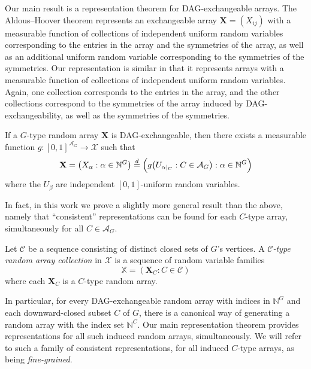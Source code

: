 \documentclass[AHL,Unicode,longabstracts,published]{cedram}
\newcommand{\indices}[1]{\mathbb{N}^{#1}}
\renewcommand{\d}{\buildrel{d}\over{=}}
\renewcommand{\AA}{\mathcal{A}}
\newcommand*\CC{{\mathcal{C}}}
\newcommand*\XX{{\mathcal{X}}}
\newcommand*\bX{\mathbf{X}}
\begin{document}
Our main result is a representation theorem for DAG-exchangeable arrays. The Aldous--Hoover theorem represents an exchangeable array $\bX = (X_{ij})$ with a measurable function of collections of independent uniform random variables corresponding to the entries in the array and the symmetries of the array, as well as an additional uniform random variable corresponding to the symmetries of the symmetries. Our representation is similar in that it represents arrays with a measurable function of collections of independent uniform random variables. Again, one collection corresponds to the entries in the array, and the other collections correspond to the symmetries of the array induced by DAG-exchangeability, as well as the symmetries of the symmetries.

\begin{theo}\label{cor 2}
If a $G$-type random array $\bX$ is DAG-exchangeable, then there exists a measurable function $g: [0,1]^{\AA_G} \to \XX$ such that
\begin{equation}\label{eqn: representation}
\bX = \left(X_\alpha : \alpha \in \indices G\right) \d \Big(g\big(U_{\alpha|_C} : C \in \AA_G\big) : \alpha \in \indices G\Big)
\end{equation}
where the $U_\beta$ are independent $[0,1]$-uniform random variables.
\end{theo}

In fact, in this work we prove a slightly more general result than the above, namely that ``consistent'' representations can be found for each $C$-type array, simultaneously for all $C\in\AA_G$.

\begin{defi}\label{def:fg-randomarray}
Let $\CC$ be a sequence consisting of distinct closed sets of $G$'s vertices. A \emph{$\CC$-type random array collection} in $\XX$ is a sequence of random variable families
\[
\mathbb{X}= (\bX_C : C \in \CC)
\]
where each $\bX_C$ is a $C$-type random array.
\end{defi}

In particular, for every DAG-exchangeable random array with indices in $\mathbb{N}^G$ and each downward-closed subset $C$ of $G$, there is a canonical way of generating a random array with the index set $\mathbb{N}^C$. Our main representation theorem provides representations for all such induced random arrays, simultaneously. We will refer to such a family of consistent representations, for all induced $C$-type arrays, as being \emph{fine-grained}.
\end{document}
